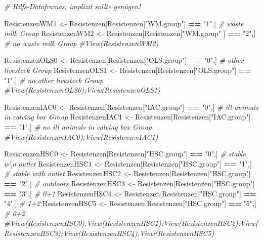 \documentclass[
]{article}
\newenvironment{Shaded}{\begin{snugshade}}{\end{snugshade}}
\newcommand{\CommentTok}[1]{\textcolor[rgb]{0.56,0.35,0.01}{\textit{#1}}}
\newcommand{\NormalTok}[1]{#1}
\newcommand{\OperatorTok}[1]{\textcolor[rgb]{0.81,0.36,0.00}{\textbf{#1}}}
\newcommand{\StringTok}[1]{\textcolor[rgb]{0.31,0.60,0.02}{#1}}
\begin{document}
\begin{Shaded}
\begin{Highlighting}[]
\CommentTok{# Hilfs-Dataframes, implizit sollte genügen!}

\NormalTok{ResistenzenWM1  <-}\StringTok{ }\NormalTok{Resistenzen[Resistenzen[}\StringTok{"WM.group"}\NormalTok{]  }\OperatorTok{==}\StringTok{ "1"}\NormalTok{,]  }\CommentTok{#    waste milk Group}
\NormalTok{ResistenzenWM2  <-}\StringTok{ }\NormalTok{Resistenzen[Resistenzen[}\StringTok{"WM.group"}\NormalTok{ ] }\OperatorTok{==}\StringTok{ "2"}\NormalTok{,]  }\CommentTok{# no waste milk Group}
\CommentTok{#View(ResistenzenWM2)}

\NormalTok{ResistenzenOLS0 <-}\StringTok{ }\NormalTok{Resistenzen[Resistenzen[}\StringTok{"OLS.group"}\NormalTok{] }\OperatorTok{==}\StringTok{ "0"}\NormalTok{,]  }\CommentTok{#    other livestock Group}
\NormalTok{ResistenzenOLS1 <-}\StringTok{ }\NormalTok{Resistenzen[Resistenzen[}\StringTok{"OLS.group"}\NormalTok{] }\OperatorTok{==}\StringTok{ "1"}\NormalTok{,]  }\CommentTok{# no other livestock  Group}
\CommentTok{#View(ResistenzenOLS0);View(ResistenzenOLS1)}

\NormalTok{ResistenzenIAC0 <-}\StringTok{ }\NormalTok{Resistenzen[Resistenzen[}\StringTok{"IAC.group"}\NormalTok{] }\OperatorTok{==}\StringTok{ "0"}\NormalTok{,]  }\CommentTok{#    ill animals in calving box Group}
\NormalTok{ResistenzenIAC1 <-}\StringTok{ }\NormalTok{Resistenzen[Resistenzen[}\StringTok{"IAC.group"}\NormalTok{] }\OperatorTok{==}\StringTok{ "1"}\NormalTok{,]  }\CommentTok{# no ill animals in calving box Group}
\CommentTok{#View(ResistenzenIAC0);View(ResistenzenIAC1)}

\NormalTok{ResistenzenHSC0 <-}\StringTok{ }\NormalTok{Resistenzen[Resistenzen[}\StringTok{"HSC.group"}\NormalTok{] }\OperatorTok{==}\StringTok{ "0"}\NormalTok{,]  }\CommentTok{# stable w\textbackslash{}o  outlet}
\NormalTok{ResistenzenHSC1 <-}\StringTok{ }\NormalTok{Resistenzen[Resistenzen[}\StringTok{"HSC.group"}\NormalTok{] }\OperatorTok{==}\StringTok{ "1"}\NormalTok{,]  }\CommentTok{# stable with outlet}
\NormalTok{ResistenzenHSC2 <-}\StringTok{ }\NormalTok{Resistenzen[Resistenzen[}\StringTok{"HSC.group"}\NormalTok{] }\OperatorTok{==}\StringTok{ "2"}\NormalTok{,]  }\CommentTok{# outdoors}
\NormalTok{ResistenzenHSC3 <-}\StringTok{ }\NormalTok{Resistenzen[Resistenzen[}\StringTok{"HSC.group"}\NormalTok{] }\OperatorTok{==}\StringTok{ "3"}\NormalTok{,]  }\CommentTok{# 0+1}
\NormalTok{ResistenzenHSC4 <-}\StringTok{ }\NormalTok{Resistenzen[Resistenzen[}\StringTok{"HSC.group"}\NormalTok{] }\OperatorTok{==}\StringTok{ "4"}\NormalTok{,]  }\CommentTok{# 1+2}
\NormalTok{ResistenzenHSC5 <-}\StringTok{ }\NormalTok{Resistenzen[Resistenzen[}\StringTok{"HSC.group"}\NormalTok{] }\OperatorTok{==}\StringTok{ "5"}\NormalTok{,]  }\CommentTok{# 0+2}
\CommentTok{#View(ResistenzenHSC0);View(ResistenzenHSC1);View(ResistenzenHSC2);View(ResistenzenHSC3);View(ResistenzenHSC4);View(ResistenzenHSC5)}
\end{Highlighting}
\end{Shaded}
\end{document}

